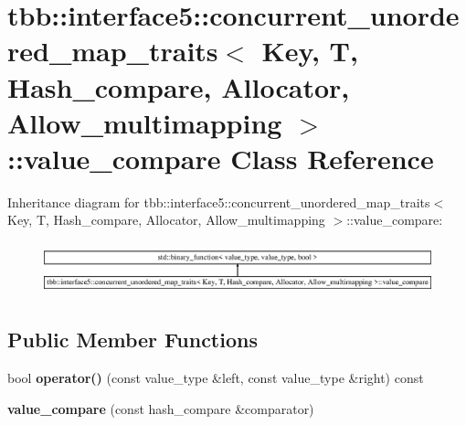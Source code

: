 \hypertarget{classtbb_1_1interface5_1_1concurrent__unordered__map__traits_1_1value__compare}{}\section{tbb\+:\+:interface5\+:\+:concurrent\+\_\+unordered\+\_\+map\+\_\+traits$<$ Key, T, Hash\+\_\+compare, Allocator, Allow\+\_\+multimapping $>$\+:\+:value\+\_\+compare Class Reference}
\label{classtbb_1_1interface5_1_1concurrent__unordered__map__traits_1_1value__compare}
Inheritance diagram for tbb\+:\+:interface5\+:\+:concurrent\+\_\+unordered\+\_\+map\+\_\+traits$<$ Key, T, Hash\+\_\+compare, Allocator, Allow\+\_\+multimapping $>$\+:\+:value\+\_\+compare\+:\begin{figure}[H]
\begin{center}
\leavevmode
\includegraphics[height=1.542700cm]{classtbb_1_1interface5_1_1concurrent__unordered__map__traits_1_1value__compare}
\end{center}
\end{figure}
\subsection*{Public Member Functions}
\begin{DoxyCompactItemize}
\item 
\hypertarget{classtbb_1_1interface5_1_1concurrent__unordered__map__traits_1_1value__compare_ab45af27d6a7ce27dfdd5cd86b9e242a4}{}bool {\bfseries operator()} (const value\+\_\+type \&left, const value\+\_\+type \&right) const \label{classtbb_1_1interface5_1_1concurrent__unordered__map__traits_1_1value__compare_ab45af27d6a7ce27dfdd5cd86b9e242a4}

\item 
\hypertarget{classtbb_1_1interface5_1_1concurrent__unordered__map__traits_1_1value__compare_a950d35402dcfda797180cfa504e62696}{}{\bfseries value\+\_\+compare} (const hash\+\_\+compare \&comparator)\label{classtbb_1_1interface5_1_1concurrent__unordered__map__traits_1_1value__compare_a950d35402dcfda797180cfa504e62696}

\end{DoxyCompactItemize}
